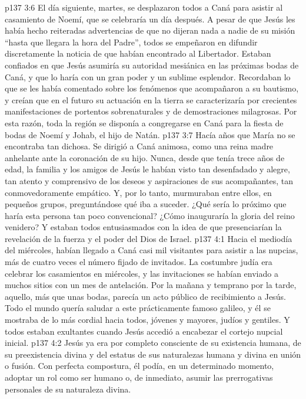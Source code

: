 \vs p137 3:6 \pc El día siguiente, martes, se desplazaron todos a Caná para asistir al casamiento de Noemí, que se celebraría un día después. A pesar de que Jesús les había hecho reiteradas advertencias de que no dijeran nada a nadie de su misión “hasta que llegara la hora del Padre”, todos se empeñaron en difundir discretamente la noticia de que habían encontrado al Libertador. Estaban confiados en que Jesús asumiría su autoridad mesiánica en las próximas bodas de Caná, y que lo haría con un gran poder y un sublime esplendor. Recordaban lo que se les había comentado sobre los fenómenos que acompañaron a su bautismo, y creían que en el futuro su actuación en la tierra se caracterizaría por crecientes manifestaciones de portentos sobrenaturales y de demostraciones milagrosas. Por esta razón, toda la región se disponía a congregarse en Caná para la fiesta de bodas de Noemí y Johab, el hijo de Natán.
\vs p137 3:7 Hacía años que María no se encontraba tan dichosa. Se dirigió a Caná animosa, como una reina madre anhelante ante la coronación de su hijo. Nunca, desde que tenía trece años de edad, la familia y los amigos de Jesús le habían visto tan desenfadado y alegre, tan atento y comprensivo de los deseos y aspiraciones de sus acompañantes, tan conmovedoramente empático. Y, por lo tanto, murmuraban entre ellos, en pequeños grupos, preguntándose qué iba a suceder. ¿Qué sería lo próximo que haría esta persona tan poco convencional? ¿Cómo inauguraría la gloria del reino venidero? Y estaban todos entusiasmados con la idea de que presenciarían la revelación de la fuerza y el poder del Dios de Israel.
\vs p137 4:1 Hacia el mediodía del miércoles, habían llegado a Caná casi mil visitantes para asistir a las nupcias, más de cuatro veces el número fijado de invitados. La costumbre judía era celebrar los casamientos en miércoles, y las invitaciones se habían enviado a muchos sitios con un mes de antelación. Por la mañana y temprano por la tarde, aquello, más que unas bodas, parecía un acto público de recibimiento a Jesús. Todo el mundo quería saludar a este prácticamente famoso galileo, y él se mostraba de lo más cordial hacia todos, jóvenes y mayores, judíos y gentiles. Y todos estaban exultantes cuando Jesús accedió a encabezar el cortejo nupcial inicial.
\vs p137 4:2 Jesús ya era por completo consciente de su existencia humana, de su preexistencia divina y del estatus de sus naturalezas humana y divina en unión o fusión. Con perfecta compostura, él podía, en un determinado momento, adoptar un rol como ser humano o, de inmediato, asumir las prerrogativas personales de su naturaleza divina.
